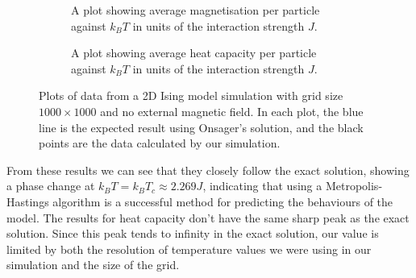 \documentclass[11pt]{article}
\begin{document}
	\begin{figure}[H]\ContinuedFloat
		\begin{subfigure}{0.45\textwidth}
			\begin{center}
			\end{center}
			\caption{A plot showing average magnetisation per particle against $k_BT$ in units of the interaction strength $J$.}
		\end{subfigure}
		\begin{subfigure}{0.45\textwidth}
			\begin{center}
			\end{center}
			\caption{A plot showing average heat capacity per particle against $k_BT$ in units of the interaction strength $J$.}
		\end{subfigure}
	
		\caption{Plots of data from a 2D Ising model simulation with grid size $1000 \times 1000$ and no external magnetic field. In each plot, the blue line is the expected result using Onsager's solution, and the black points are the data calculated by our simulation.}
		\label{fig:2d_1000_result}
	\end{figure}
	
	From these results we can see that they closely follow the exact solution, showing a phase change at $k_BT = k_BT_c \approx 2.269J$, indicating that using a Metropolis-Hastings algorithm is a successful method for predicting the behaviours of the model. The results for heat capacity don't have the same sharp peak as the exact solution. Since this peak tends to infinity in the exact solution, our value is limited by both the resolution of temperature values we were using in our simulation and the size of the grid. 
	
\end{document}
